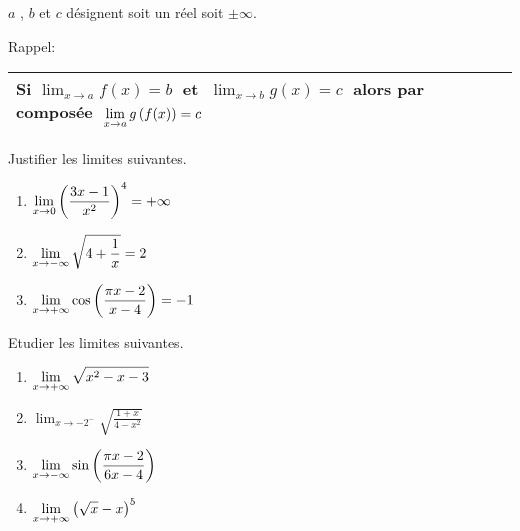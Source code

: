 
\everymath{\displaystyle}


  \summary{}


$a $ , $b $ \; et \; $ c $ désignent soit un réel soit $ \pm\infty $.

\medskip
Rappel: \begin{tabularx}{\textwidth}{|X|}
\hline
Si  $ \displaystyle\lim_{x \to a}f(x)=b \;$ et  $\;   \displaystyle\lim_{x \to b}g(x)=c \;$ alors  par composée  $\;   \displaystyle\lim_{x \to a}g\left(f(x)\right)=c $\\
\hline
\end{tabularx}
 \medskip
 
\begin{exercice}
  Justifier  les limites suivantes.
\begin{enumerate}
\item  $\displaystyle \lim_{x \to 0}\left(\frac{3x-1}{x^2}\right)^{4}=+\infty$
\item   $\displaystyle\lim_{x \to -\infty}  \sqrt{4+\frac{1}{x}}=2$ 
 \item  $\displaystyle\lim_{x \to +\infty}\cos\left(\frac{\pi x-2}{x-4}\right) =-1$
 \end{enumerate}
\end{exercice}
\bigskip


\begin{exercice}
Etudier   les limites suivantes.
\medskip

\begin{enumerate}
\item $\displaystyle \lim_{x \to +\infty}\sqrt{x^2-x-3}$
\item   $\displaystyle\lim_{x \to -2^{-}}  \sqrt{\frac{1+x}{4-x^2}}$  
\item    $\displaystyle\lim_{x \to -\infty}\sin\left(\frac{\pi x-2}{6x-4}\right)$
\item   $\displaystyle\lim_{x \to +\infty}\left(\sqrt{x}-x\right)^5$
\end{enumerate}
\end{exercice}
\bigskip


